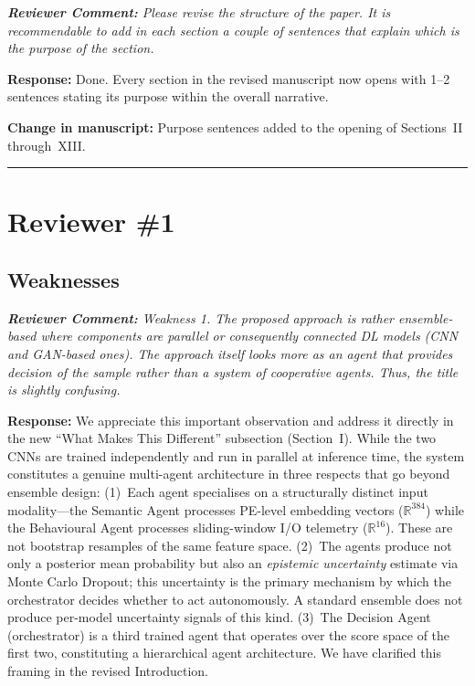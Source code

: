 \documentclass[11pt,a4paper]{article}
\newcommand{\RC}[1]{\begin{reviewbox}\textit{\textbf{Reviewer Comment:} #1}\end{reviewbox}}
\newcommand{\RS}[1]{\noindent\textcolor{responsegreen}{\textbf{Response:}} #1\par\medskip}
\newcommand{\CH}[1]{\noindent\textcolor{changebrown}{\textbf{Change in manuscript:}} #1\par\bigskip}
\begin{document}
\RC{Please revise the structure of the paper. It is recommendable to add in each
section a couple of sentences that explain which is the purpose of the section.}

\RS{Done. Every section in the revised manuscript now opens with 1--2 sentences
stating its purpose within the overall narrative.}

\CH{Purpose sentences added to the opening of Sections~II through~XIII.}

\bigskip
\hrule
\bigskip

\section{Reviewer \#1}

\subsection*{Weaknesses}

\RC{Weakness 1. The proposed approach is rather ensemble-based where components are
parallel or consequently connected DL models (CNN and GAN-based ones). The approach
itself looks more as an agent that provides decision of the sample rather than a
system of cooperative agents. Thus, the title is slightly confusing.}

\RS{We appreciate this important observation and address it directly in the new
``What Makes This Different'' subsection (Section~I). While the two CNNs are trained
independently and run in parallel at inference time, the system constitutes a genuine
multi-agent architecture in three respects that go beyond ensemble design: (1)~Each
agent specialises on a structurally distinct input modality---the Semantic Agent
processes PE-level embedding vectors ($\mathbb{R}^{384}$) while the Behavioural Agent
processes sliding-window I/O telemetry ($\mathbb{R}^{16}$). These are not bootstrap
resamples of the same feature space. (2)~The agents produce not only a posterior
mean probability but also an \emph{epistemic uncertainty} estimate via Monte Carlo
Dropout; this uncertainty is the primary mechanism by which the orchestrator decides
whether to act autonomously. A standard ensemble does not produce per-model
uncertainty signals of this kind. (3)~The Decision Agent (orchestrator) is a third
trained agent that operates over the score space of the first two, constituting a
hierarchical agent architecture. We have clarified this framing in the revised
Introduction.}
\end{document}
